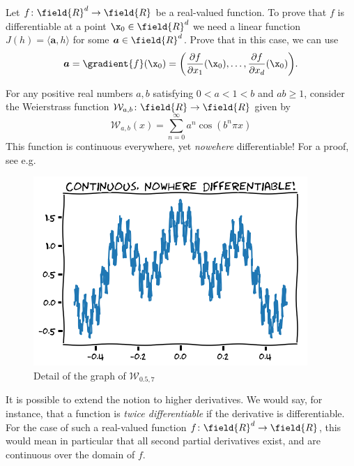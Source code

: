 \begin{problem}\label{problem:gradient}
Let $f\colon \field{R}^d \to \field{R}$ be a real-valued function.  To prove that $f$ is differentiable at a point $\x_0 \in \field{R}^d$ we need a linear function $J(h) = \langle \boldsymbol{a}, h \rangle$ for some $\boldsymbol{a} \in \field{R}^d$.  Prove that in this case, we can use
\begin{equation*}
\boldsymbol{a} = \gradient{f}(\x_0)= \bigg( \frac{\partial f}{\partial x_1}(\x_0), \dotsc, \frac{\partial f}{\partial x_d}(\x_0) \bigg).
\end{equation*}
\end{problem}

\begin{example}\label{example:WeierstrassFunction}
For any positive real numbers $a, b$ satisfying $0<a<1<b$ and $ab \geq 1$, consider the Weierstrass function $\mathcal{W}_{a,b} \colon \field{R} \to \field{R}$ given by 
\begin{equation*}
\mathcal{W}_{a,b}(x) = \sum_{n=0}^\infty a^n \cos(b^n \pi x)
\end{equation*}
This function is continuous everywhere, yet \emph{nowehere} differentiable!  For a proof, see e.g.~\cite{hardy1916weierstrass}
\begin{figure}[ht!]
\includegraphics[width=0.6\linewidth]{weierstrass.png}
\caption{Detail of the graph of $\mathcal{W}_{0.5, 7}$}
\label{figure:WeierstrassFunction}
\end{figure}
\end{example}

It is possible to extend the notion to higher derivatives.  We would say, for instance, that a function is \emph{twice differentiable} if the derivative is differentiable.  For the case of such a real-valued function $f \colon \field{R}^d \to \field{R}$, this would mean in particular that all second partial derivatives exist, and are continuous over the domain of $f$.

